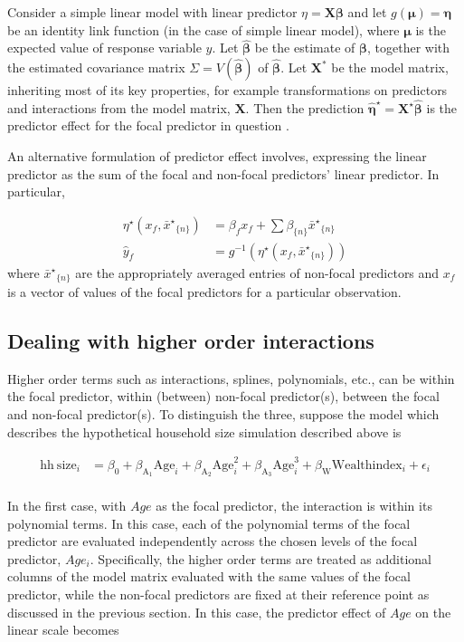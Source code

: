 \documentclass[10pt,letterpaper]{article}
\newcommand{\bX}{{\mathbf X}}
\newcommand{\bbeta}{{\boldsymbol \beta}}
\newcommand{\boldeta}{{\boldsymbol \eta}}
\newcommand{\boldmu}{{\boldsymbol \mu}}
\newcommand{\nset}[1]{#1_{\{n\}}}
\begin{document}
Consider a simple linear model with linear predictor $\eta = \bX\bbeta$ and let $g(\boldmu) = \boldeta$ be an identity link function (in the case of simple linear model), where $\boldmu$ is the expected value of response variable $y$. Let $\hat{\bbeta}$ be the estimate of $\bbeta$, together with the estimated covariance matrix $\Sigma = V(\hat{\bbeta})$ of $\hat{\bbeta}$. Let $\mathbf{X^*}$ be the model matrix, inheriting most of its key properties, for example transformations on predictors and interactions from the model matrix, $\mathbf{X}$. Then the prediction $\hat{\boldeta}^\star = \bX^\star\hat{\bbeta}$ is the predictor effect for the focal predictor in question \cite{fox2009effect}.

An alternative formulation of predictor effect involves, expressing the linear predictor as the sum of the focal and non-focal predictors' linear predictor. In particular, 

\begin{align}\label{eq:eta_mean}
\eta^\star(x_f, \nset{{\bar{x}^\star}}) &= \beta_f x_f + \sum \nset{\beta} \nset{{\bar{x}^\star}} \\
\hat{y}_f  &= g^{-1} \left(\eta^\star(x_f, \nset{{\bar{x}^\star}})\right)
\end{align}
where $\nset{{\bar{x}^\star}}$ are the appropriately averaged entries of non-focal predictors and $x_f$ is a vector of values of the focal predictors for a particular observation.


\subsection*{Dealing with higher order interactions}

Higher order terms such as interactions, splines, polynomials, etc., can be within the focal predictor, within (between) non-focal predictor(s), between the focal and non-focal predictor(s). To distinguish the three, suppose the model which describes the hypothetical household size simulation described above is

\begin{align}\label{sim:lm_cubic}
\mathrm{hh~size}_i &= \beta_0 + \beta_{\mathrm{A_1}}\mathrm{Age}_i + \beta_{\mathrm{A_2}}\mathrm{Age}^2_i + \beta_{\mathrm{A_3}}\mathrm{Age}^3_i + \beta_{\mathrm{W}}\mathrm{Wealthindex}_i + \epsilon_i \nonumber\\
\end{align}

In the first case, with $Age$ as the focal predictor, the interaction is within its polynomial terms. In this case, each of the polynomial terms of the focal predictor are evaluated independently across the chosen levels of the focal predictor, $Age_i$. Specifically, the higher order terms are treated as additional columns of the model matrix evaluated with the same values of the focal predictor, while the non-focal predictors are fixed at their reference point as discussed in the previous section. In this case, the predictor effect of $Age$ on the linear scale becomes
\end{document}
